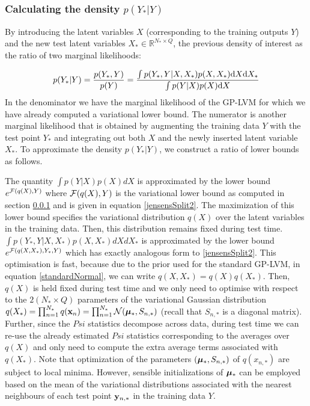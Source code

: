 \subsubsection{\label{predictions1} Calculating the density $p(Y_*|Y)$}
By introducing the latent variables $X$ (corresponding to the
training outputs $Y$) and the new test latent variables 
$X_* \in \mathbb{R}^{N_* \times Q}$, the
previous density of interest as the ratio of two marginal likelihoods:

\begin{equation}
\label{pyystar1}
p(Y_*|Y) = \frac{p(Y_*,Y)}{p(Y)} = 
	\frac{\int p(Y_*, Y | X, X_*) p(X,X_*) \text{d} X \text{d} X_*}{\int p(Y|X) p(X) \text{d} X}
\end{equation}
%
In the denominator 
we have the marginal likelihood of the GP-LVM for which we have already
computed a variational lower bound.  The numerator is another 
marginal likelihood that is obtained by augmenting the training data
$Y$ with the test point $Y_*$ and integrating out both $X$ and the 
newly inserted latent variable $X_*$. To approximate the density 
 $p(Y_* |Y)$, we construct a ratio of lower bounds as follows. 

The quantity $ \int p(Y | X) p(X) d X$ is approximated by the
 lower bound $e^{\mathcal{F}(q(X),Y)}$ where 
$\mathcal{F}(q(X),Y)$ is the variational lower bound as computed in section \ref{}
and is given in equation \eqref{jensensSplit2}. The maximization   
of this lower bound  specifies the variational
distribution $q(X)$ over the latent variables in the training
data. Then, this distribution  remains fixed during test time.     
$\int p(Y_*,Y | X, X_*) p(X,X_*) d X d X_*$ 
is approximated by the lower bound $e^{\mathcal{F}(q(X,X_*), Y_*,Y)}$ which has
exactly analogous form to \eqref{jensensSplit2}. 
This optimisation is fast, because due to the prior used for the standard
GP-LVM, in equation \eqref{standardNormal}, we can write
$q(X,X_*) = q(X) q(X_*)$. Then, $q(X)$ is held fixed during test time and we only need
to optimise with respect to the $2 (N_* \times Q)$ parameters of the variational
Gaussian distribution $q(X_*)=\prod_{n=1}^{N_*} q(\mathbf{x}_n) = \prod_{n=1}^{N_*} \mathcal{N}(\boldsymbol \mu_*,S_{n,*})$ 
(recall that $S_{n,*}$ is a diagonal matrix). 
Further, since the $Psi$ statistics decompose
across data, during test time we can re-use the already estimated $Psi$ statistics
corresponding to the averages over $q(X)$ and only need to compute the extra average
terms associated with $q(X_*)$.
Note that optimization of the parameters $(\boldsymbol \mu_*,S_{n,*})$ of $q(x_{n,*})$ are subject
to local minima. However, 
sensible initializations of $\boldsymbol \mu_*$ can be employed based on the 
mean of the variational distributions associated with the nearest
neighbours of each test point $\mathbf{y}_{n,*}$ in the training data $Y$. 
%

